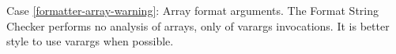 Case \ref{formatter-array-warning}:
  Array format arguments.
  The Format String Checker performs no analysis of
  arrays, only of varargs invocations.  It is better style to use varargs
  when possible.


% 
% 
% 
% 
% 
